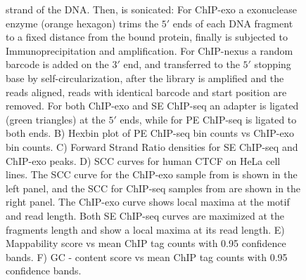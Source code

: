 \documentclass{bmcart}
\begin{document}
\begin{figure}[h!]
{    strand of the DNA. Then, is sonicated: For ChIP-exo a exonuclease
    enzyme (orange hexagon) trims the $5\prime$ ends of each DNA
    fragment to a fixed distance from the bound protein, finally is
    subjected to Immunoprecipitation and amplification. For ChIP-nexus
    a random barcode is added on the $3\prime$ end, and transferred to
    the $5\prime$ stopping base by self-circularization, after the
    library is amplified and the reads aligned, reads with identical
    barcode and start position are removed. For both ChIP-exo and SE
    ChIP-seq an adapter is ligated (green triangles) at the $5\prime$
    ends, while for PE ChIP-seq is ligated to both ends.  B) Hexbin
    plot of PE ChIP-seq bin counts vs ChIP-exo bin counts. C) Forward
    Strand Ratio densities for SE ChIP-seq and ChIP-exo peaks. D) SCC
    curves for human CTCF on HeLa cell lines.  The SCC curve for the
    ChIP-exo sample from \cite{exo1} is shown in the left panel, and
    the SCC for ChIP-seq samples from \cite{encode1} are shown in the
    right panel. The ChIP-exo curve shows local maxima at the motif
    and read length. Both SE ChIP-seq curves are maximized at the
    fragments length and show a local maxima at its read length. E)
    Mappability score vs mean ChIP tag counts with 0.95 confidence
    bands. F) GC - content score vs mean ChIP tag counts with 0.95
    confidence bands.}
  \label{fig:1}
\end{figure}



\newpage

\end{document}
